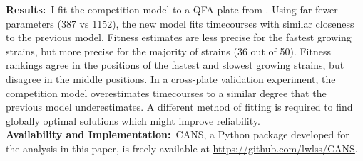 \textbf{Results:}~I fit the competition model to a QFA plate from
\citet{Addinall2011}.
Using far fewer parameters (387 vs 1152), the new model fits
timecourses with similar closeness to the previous model.
Fitness estimates are less precise for the fastest growing strains,
but more precise for the majority of strains (36 out of 50). Fitness
rankings agree in the positions of the fastest and slowest growing
strains, but disagree in the middle positions.
In a cross-plate validation experiment,
the competition model overestimates timecourses to a similar degree
that the previous model underestimates. A different method of fitting
is required to find globally optimal solutions which might improve
reliability.
\\
\textbf{Availability and Implementation:}~CANS, a Python package
developed for the analysis in this paper, is freely available at
\href{https://github.com/lwlss/CANS}{https://github.com/lwlss/CANS}.
